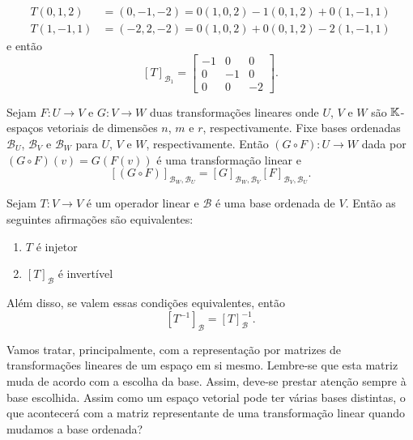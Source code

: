 \begin{exemplos}
\begin{enumerate}[label={\arabic*})]
\begin{solucao}
\begin{align*}
        T(0, 1, 2) &= (0, -1, -2) = 0(1, 0, 2) - 1(0, 1, 2) + 0(1, -1, 1)\\
        T(1, -1, 1) &= (-2, 2, -2) = 0(1, 0, 2) + 0(0, 1, 2) - 2(1, -1, 1)
      \end{align*}
      e então
      \[
        [T]_{\mathcal{B}_1} = \begin{bmatrix}-1 & 0 & 0\\0 & -1 & 0\\0 & 0 & -2\end{bmatrix}.
      \]
    \end{solucao}
  \end{enumerate}
\end{exemplos}

\begin{teorema}\label{matriz_da_composicao_de_transformacoes}
  Sejam $F \colon U \to V$ e $G \colon V \to W$ duas transformações lineares onde $U$, $V$ e $W$ são $\mathbb{K}$-espaços vetoriais de dimensões $n$, $m$ e $r$, respectivamente. Fixe bases ordenadas $\mathcal{B}_U$, $\mathcal{B}_V$ e $\mathcal{B}_W$ para $U$, $V$ e $W$, respectivamente. Então $(G \circ F) \colon U \to W$ dada por $(G\circ F)(v) = G(F(v))$ é uma transformação linear e
  \[
    [(G \circ F)]_{{\mathcal{B}_W},{\mathcal{B}_U}} = [G]_{{\mathcal{B}_W},{\mathcal{B}_V}}[F]_{{\mathcal{B}_V},{\mathcal{B}_U}}.
  \]
\end{teorema}

\begin{teorema}
  Sejam $T \colon V \to V$ é um operador linear e $\mathcal{B}$ é uma base ordenada de $V$. Então as seguintes afirmações são equivalentes:
  \begin{enumerate}[label={\roman*})]
    \item $T$ é injetor
    \item $[T]_\mathcal{B}$ é invertível
  \end{enumerate}
  Além disso, se valem essas condições equivalentes, então
  \[
    [T^{-1}]_\mathcal{B} = [T]_\mathcal{B}^{-1}.
  \]
\end{teorema}

Vamos tratar, principalmente, com a representação por matrizes de transformações lineares de um espaço em si mesmo. Lembre-se que esta matriz muda de acordo com a escolha da base. Assim, deve-se prestar atenção sempre \`a base escolhida. Assim como um espaço vetorial pode ter várias bases distintas, o que acontecerá com a matriz representante de uma transformação linear quando mudamos a base ordenada?

